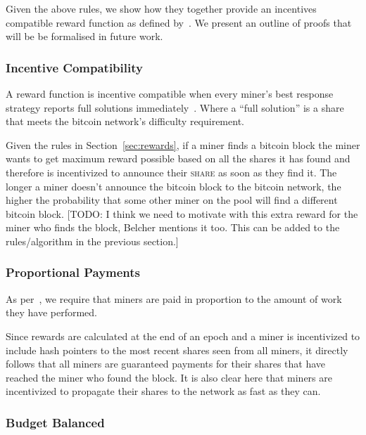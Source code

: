 \documentclass{article}
\begin{document}
Given the above rules, we show how they together provide an incentives
compatible reward function as defined
by~\cite{incentives-compatible}. We present an outline of proofs that
will be be formalised in future work.

\subsubsection{Incentive Compatibility}\label{sec:incentive-compatability}

A reward function is incentive compatible when every miner's best
response strategy reports full solutions
immediately~\cite{incentives-compatible}. Where a ``full solution'' is
a share that meets the bitcoin network's difficulty requirement.

Given the rules in Section~\ref{sec:rewards}, if a miner finds a
bitcoin block the miner wants to get maximum reward possible based on
all the shares it has found and therefore is incentivized to announce
their \textsc{share} as soon as they find it. The longer a miner
doesn't announce the bitcoin block to the bitcoin network, the higher
the probability that some other miner on the pool will find a
different bitcoin block. [TODO: I think we need to motivate with this
extra reward for the miner who finds the block, Belcher mentions it
too. This can be added to the rules/algorithm in the previous
section.]

\subsubsection{Proportional Payments}\label{sec:proportional-payments}

As per~\cite{incentives-compatible}, we require that miners are paid
in proportion to the amount of work they have performed.

Since rewards are calculated at the end of an epoch and a miner is
incentivized to include hash pointers to the most recent shares seen
from all miners, it directly follows that all miners are guaranteed
payments for their shares that have reached the miner who found the
block. It is also clear here that miners are incentivized to propagate
their shares to the network as fast as they can.

\subsubsection{Budget Balanced}\label{sec:budget-balanced}
\end{document}
